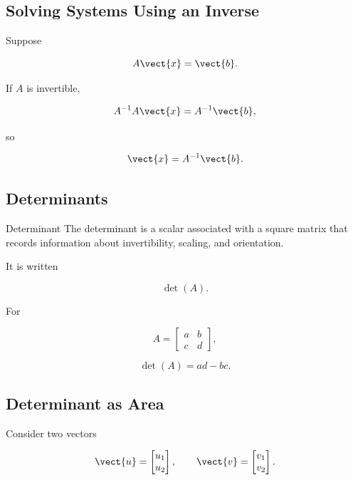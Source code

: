 \subsection{Solving Systems Using an Inverse}
\label{subsec:systems-inverse}

Suppose

\[ A\vect{x}=\vect{b}. \]

If \(A\) is invertible,

\[ A^{-1}A\vect{x}=A^{-1}\vect{b}, \]

so

\[ \vect{x}=A^{-1}\vect{b}. \]

\subsection{Determinants}
\label{subsec:determinants}

\begin{definitionbox}{Determinant}
The determinant is a scalar associated with a square matrix that records
information about invertibility, scaling, and orientation.
\end{definitionbox}

It is written

\[ \det(A). \]

For

\[ A=\begin{bmatrix}a&b\\c&d\end{bmatrix}, \]

\[ \det(A)=ad-bc. \]

\subsection{Determinant as Area}
\label{subsec:determinant-area}

Consider two vectors

\[ \vect{u}=\begin{bmatrix}u_1\\u_2\end{bmatrix},\qquad
\vect{v}=\begin{bmatrix}v_1\\v_2\end{bmatrix}. \]

